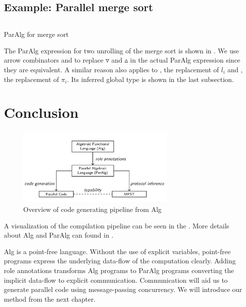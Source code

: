 \subsection{Example: Parallel merge sort}
\begin{listing}[ht]
\inputminted{text}{project/ms.txt}
\caption{ParAlg for merge sort}
\label{project:code:mspar}
\end{listing}

The ParAlg expression for two unrolling of the merge sort is shown in . We use arrow combinators \hask{&&&} and \hask{|||} to replace $\triangledown$ and $\vartriangle$ in the actual ParAlg expression since they are equivalent. A similar reason also applies to , the replacement of $l_i$ and , the replacement of $\pi_i$. Its inferred global type is shown in the last subsection.

\section{Conclusion}
\begin{figure}[ht]
    \centering
    \includegraphics[width=0.7\textwidth]{project/pipeline.png}
    \caption{Overview of code generating pipeline from Alg\cite{AlgebraicMultipartyProtocol}}
    \label{project:fig:pipeline}
\end{figure}
A visualization of the compilation pipeline can be seen in the . More details about Alg and ParAlg can found in \cite{AlgebraicMultipartyProtocol}.

Alg is a point-free language. Without the use of explicit variables, point-free programs express the underlying data-flow of the computation clearly. Adding role annotations transforms Alg programs to ParAlg programs converting the implicit data-flow to explicit communication. Communication will aid us to generate parallel code using message-passing concurrency. We will introduce our method from the next chapter.